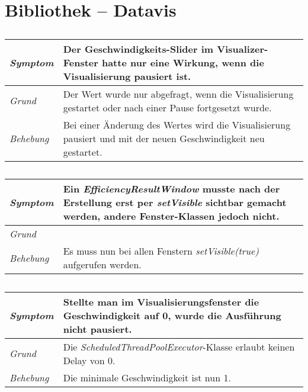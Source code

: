 \documentclass[a4paper]{report}
\begin{document}
\section{Bibliothek -- Datavis}

\subsection{}
\begin{tabular}{p{2.5cm}  p{11.5cm}}
  \hline
  \textit{Symptom} & Der Geschwindigkeits-Slider im Visualizer-Fenster hatte nur eine Wirkung, wenn die Visualisierung pausiert ist. \\
  \hline
  \textit{Grund} & Der Wert wurde nur abgefragt, wenn die Visualisierung gestartet oder nach einer Pause fortgesetzt wurde. \\
  \hline
  \textit{Behebung} & Bei einer Änderung des Wertes wird die Visualisierung pausiert und mit der neuen Geschwindigkeit neu gestartet. \\
  \hline
\end{tabular}

\subsection{}
\begin{tabular}{p{2.5cm}  p{11.5cm}}
  \hline
  \textit{Symptom} & Ein \emph{EfficiencyResultWindow} musste nach der Erstellung erst per \emph{setVisible} sichtbar gemacht werden, andere Fenster-Klassen jedoch nicht. \\
  \hline
  \textit{Grund} & \\
  \hline
  \textit{Behebung} & Es muss nun bei allen Fenstern \emph{setVisible(true)} aufgerufen werden. \\
  \hline
\end{tabular}

\subsection{}
\begin{tabular}{p{2.5cm}  p{11.5cm}}
  \hline
  \textit{Symptom} & Stellte man im Visualisierungsfenster die Geschwindigkeit auf 0, wurde die Ausführung nicht pausiert. \\
  \hline
  \textit{Grund} & Die \emph{ScheduledThreadPoolExecutor}-Klasse erlaubt keinen Delay von 0. \\
  \hline
  \textit{Behebung} & Die minimale Geschwindigkeit ist nun 1. \\
  \hline
\end{tabular}
\end{document}
